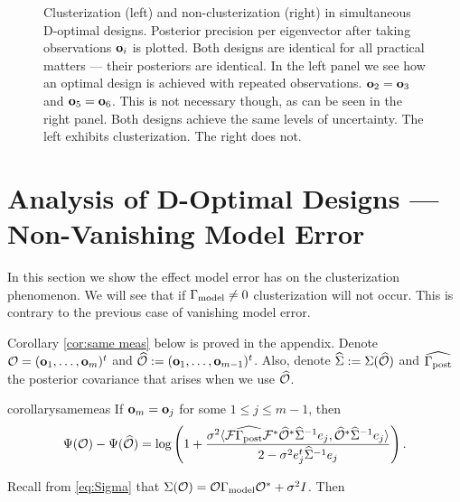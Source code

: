 \documentclass{amsart}
\numberwithin{equation}{section}
\begin{document}
\begin{figure}
  \caption{Clusterization (left) and non-clusterization (right) in
    simultaneous D-optimal designs. Posterior precision per
    eigenvector after taking observations $\mathbf{o}_i$ is plotted. Both
    designs are identical for all practical matters --- their
    posteriors are identical. In the left panel we see how an optimal
    design is achieved with repeated observations. $\mathbf{o}_2 = \mathbf{o}_3$
    and $\mathbf{o}_5 = \mathbf{o}_6$. This is not necessary though, as can be
    seen in the right panel. Both designs achieve the same levels of
    uncertainty. The left exhibits clusterization. The right does not.}
  \label{fig:clusterization}
\end{figure}







\section{Analysis of D-Optimal Designs --- Non-Vanishing Model Error}\label{section:non vanishing}
In this section we show the effect model error has on the
clusterization phenomenon. We will see that if $\Gamma_{\textup{model}} \neq 0$
clusterization will not occur. This is contrary to the previous case
of vanishing model error.

Corollary \ref{cor:same meas} below is proved in the appendix. Denote
$\mathcal{O} = (\mathbf{o}_1,\dots,\mathbf{o}_m)^t$ and $\widehat{\mathcal{O}} :=
(\mathbf{o}_1,\dots,\mathbf{o}_{m-1})^t$. Also, denote $\widehat{\Sigma} := \Sigma (\widehat{\mathcal{O}})$ and
$\widehat{\Gamma_{\textup{post}}}$ the posterior covariance that arises when we use $\widehat{\mathcal{O}}$.
\begin{restatable*}{corollary}{samemeas}\label{cor:same meas}
  If $\mathbf{o}_m = \mathbf{o}_j$ for some $1 \leq j \leq m-1$, then
  \begin{equation*}
    \Psi(\mathcal{O}) - \Psi(\widehat{\mathcal{O}}) =
    \log \left ( 1 + \frac{\sigma^2
      \langle \mathcal{F} \widehat{\Gamma_{\textup{post}}} \mathcal{F}^* \widehat{\mathcal{O}}^* \widehat{\Sigma}^{-1} e_j,
      \widehat{\mathcal{O}}^* \widehat{\Sigma}^{-1}e_j \rangle
    }{
      2 - \sigma^2 e_j^t\widehat{\Sigma}^{-1}e_j 
    }       
    \right ).
  \end{equation*}
\end{restatable*}
Recall from \eqref{eq:Sigma} that $\Sigma(\mathcal{O}) = \mathcal{O} \Gamma_{\textup{model}} \mathcal{O}^*
+ \sigma^2I$. Then
\end{document}
